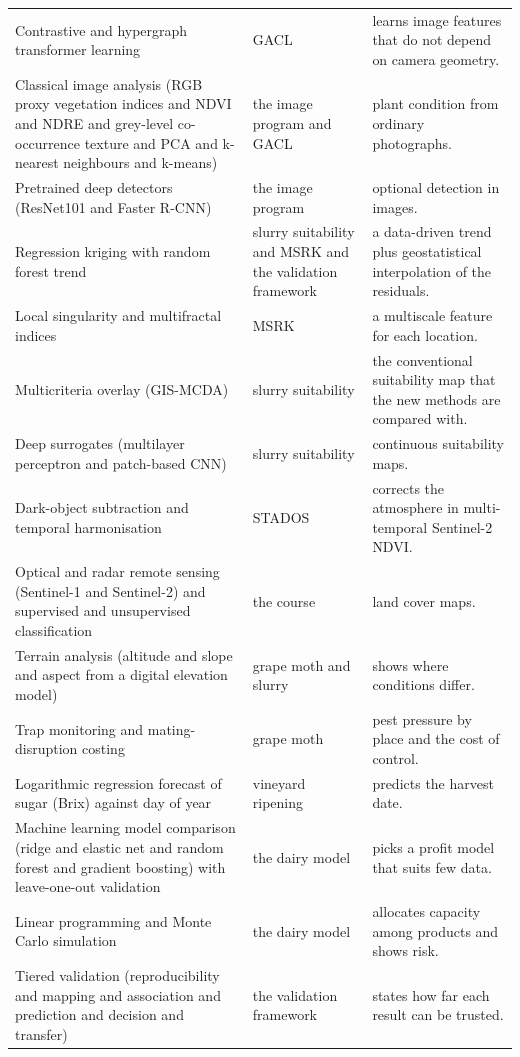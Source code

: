 \documentclass[11pt,a4paper]{article}
\begin{document}
\begin{longtable}{@{}R{3.6cm}R{5.0cm}R{6.6cm}@{}}
Contrastive and hypergraph transformer learning & GACL & learns image features that do not depend on camera geometry.\\
Classical image analysis (RGB proxy vegetation indices and NDVI and NDRE and grey-level co-occurrence texture and PCA and k-nearest neighbours and k-means) & the image program and GACL & plant condition from ordinary photographs.\\
Pretrained deep detectors (ResNet101 and Faster R-CNN) & the image program & optional detection in images.\\
Regression kriging with random forest trend & slurry suitability and MSRK and the validation framework & a data-driven trend plus geostatistical interpolation of the residuals.\\
Local singularity and multifractal indices & MSRK & a multiscale feature for each location.\\
Multicriteria overlay (GIS-MCDA) & slurry suitability & the conventional suitability map that the new methods are compared with.\\
Deep surrogates (multilayer perceptron and patch-based CNN) & slurry suitability & continuous suitability maps.\\
Dark-object subtraction and temporal harmonisation & STADOS & corrects the atmosphere in multi-temporal Sentinel-2 NDVI.\\
Optical and radar remote sensing (Sentinel-1 and Sentinel-2) and supervised and unsupervised classification & the course & land cover maps.\\
Terrain analysis (altitude and slope and aspect from a digital elevation model) & grape moth and slurry & shows where conditions differ.\\
Trap monitoring and mating-disruption costing & grape moth & pest pressure by place and the cost of control.\\
Logarithmic regression forecast of sugar (Brix) against day of year & vineyard ripening & predicts the harvest date.\\
Machine learning model comparison (ridge and elastic net and random forest and gradient boosting) with leave-one-out validation & the dairy model & picks a profit model that suits few data.\\
Linear programming and Monte Carlo simulation & the dairy model & allocates capacity among products and shows risk.\\
Tiered validation (reproducibility and mapping and association and prediction and decision and transfer) & the validation framework & states how far each result can be trusted.\\
\bottomrule\end{longtable}
\end{document}
